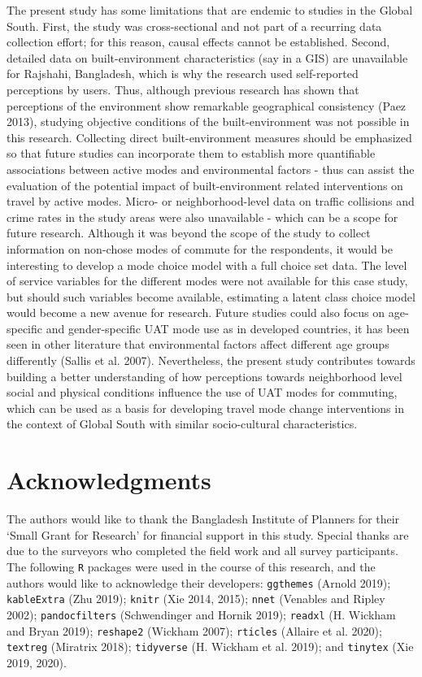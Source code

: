 \documentclass[]{elsarticle} %
\begin{document}
The present study has some limitations that are endemic to studies in
the Global South. First, the study was cross-sectional and not part of a
recurring data collection effort; for this reason, causal effects cannot
be established. Second, detailed data on built-environment
characteristics (say in a GIS) are unavailable for Rajshahi, Bangladesh,
which is why the research used self-reported perceptions by users. Thus,
although previous research has shown that perceptions of the environment
show remarkable geographical consistency (Paez 2013), studying objective
conditions of the built-environment was not possible in this research.
Collecting direct built-environment measures should be emphasized so
that future studies can incorporate them to establish more quantifiable
associations between active modes and environmental factors - thus can
assist the evaluation of the potential impact of built-environment
related interventions on travel by active modes. Micro- or
neighborhood-level data on traffic collisions and crime rates in the
study areas were also unavailable - which can be a scope for future
research. Although it was beyond the scope of the study to collect
information on non-chose modes of commute for the respondents, it would
be interesting to develop a mode choice model with a full choice set
data. The level of service variables for the different modes were not
available for this case study, but should such variables become
available, estimating a latent class choice model would become a new
avenue for research. Future studies could also focus on age-specific and
gender-specific UAT mode use as in developed countries, it has been seen
in other literature that environmental factors affect different age
groups differently (Sallis et al. 2007). Nevertheless, the present study
contributes towards building a better understanding of how perceptions
towards neighborhood level social and physical conditions influence the
use of UAT modes for commuting, which can be used as a basis for
developing travel mode change interventions in the context of Global
South with similar socio-cultural characteristics.

\hypertarget{acknowledgments}{%
\section{Acknowledgments}\label{acknowledgments}}

The authors would like to thank the Bangladesh Institute of Planners for
their `Small Grant for Research' for financial support in this study.
Special thanks are due to the surveyors who completed the field work and
all survey participants. The following \texttt{R} packages were used in
the course of this research, and the authors would like to acknowledge
their developers: \texttt{ggthemes} (Arnold 2019); \texttt{kableExtra}
(Zhu 2019); \texttt{knitr} (Xie 2014, 2015); \texttt{nnet} (Venables and
Ripley 2002); \texttt{pandocfilters} (Schwendinger and Hornik 2019);
\texttt{readxl} (H. Wickham and Bryan 2019); \texttt{reshape2} (Wickham
2007); \texttt{rticles} (Allaire et al. 2020); \texttt{textreg}
(Miratrix 2018); \texttt{tidyverse} (H. Wickham et al. 2019); and
\texttt{tinytex} (Xie 2019, 2020).
\end{document}
